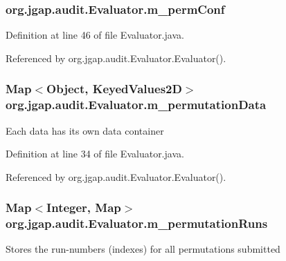 \hypertarget{classorg_1_1jgap_1_1audit_1_1_evaluator_aec14a492e20dcda8a92c18a8c76c10f3}{
\subsubsection[{m\-\_\-perm\-Conf}]{ org.\-jgap.\-audit.\-Evaluator.\-m\-\_\-perm\-Conf\hspace{0.3cm}{\ttfamily [private]}}}\label{classorg_1_1jgap_1_1audit_1_1_evaluator_aec14a492e20dcda8a92c18a8c76c10f3}


Definition at line 46 of file Evaluator.\-java.



Referenced by org.\-jgap.\-audit.\-Evaluator.\-Evaluator().

\hypertarget{classorg_1_1jgap_1_1audit_1_1_evaluator_ab3402fedd8070cb0c0b8c693148b1c01}{
\subsubsection[{m\-\_\-permutation\-Data}]{\setlength{\rightskip}{0pt plus 5cm}Map$<$Object, {\bf Keyed\-Values2\-D}$>$ org.\-jgap.\-audit.\-Evaluator.\-m\-\_\-permutation\-Data\hspace{0.3cm}{\ttfamily [private]}}}\label{classorg_1_1jgap_1_1audit_1_1_evaluator_ab3402fedd8070cb0c0b8c693148b1c01}
Each data has its own data container 

Definition at line 34 of file Evaluator.\-java.



Referenced by org.\-jgap.\-audit.\-Evaluator.\-Evaluator().

\hypertarget{classorg_1_1jgap_1_1audit_1_1_evaluator_a841cc8c34e1870b35fe0e38715841e15}{
\subsubsection[{m\-\_\-permutation\-Runs}]{\setlength{\rightskip}{0pt plus 5cm}Map$<$Integer, Map$>$ org.\-jgap.\-audit.\-Evaluator.\-m\-\_\-permutation\-Runs\hspace{0.3cm}{\ttfamily [private]}}}\label{classorg_1_1jgap_1_1audit_1_1_evaluator_a841cc8c34e1870b35fe0e38715841e15}
Stores the run-\/numbers (indexes) for all permutations submitted 

